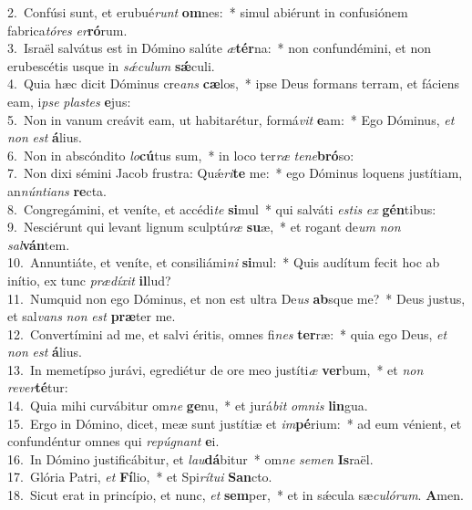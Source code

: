 {2.~}Confúsi sunt, et erubué\textit{runt} \textbf{om}nes:~* simul abiérunt in confusiónem fabrica\textit{tó}\textit{res} \textit{er}\textbf{ró}rum.\\
{3.~}Israël salvátus est in Dómino salúte \textit{æ}\textbf{tér}na:~* non confundémini, et non erubescétis usque in \textit{sǽ}\textit{cu}\textit{lum} \textbf{sǽ}culi.\\
{4.~}Quia hæc dicit Dóminus cre\textit{ans} \textbf{cæ}los,~* ipse Deus formans terram, et fáciens eam, i\textit{pse} \textit{pla}\textit{stes} \textbf{e}jus:\\
{5.~}Non in vanum creávit eam, ut habitarétur, formá\textit{vit} \textbf{e}am:~* Ego Dóminus, \textit{et} \textit{non} \textit{est} \textbf{á}lius.\\
{6.~}Non in abscóndito \textit{lo}\textbf{cú}tus sum,~* in loco ter\textit{ræ} \textit{te}\textit{ne}\textbf{bró}so:\\
{7.~}Non dixi sémini Jacob frustra: Quǽ\textit{ri}\textbf{te} me:~* ego Dóminus loquens justítiam, an\textit{nún}\textit{ti}\textit{ans} \textbf{re}cta.\\
{8.~}Congregámini, et veníte, et accédi\textit{te} \textbf{si}mul~* qui salváti \textit{e}\textit{stis} \textit{ex} \textbf{gén}tibus:\\
{9.~}Nesciérunt qui levant lignum sculptú\textit{ræ} \textbf{su}æ,~* et rogant de\textit{um} \textit{non} \textit{sal}\textbf{ván}tem.\\
{10.~}Annuntiáte, et veníte, et consiliámi\textit{ni} \textbf{si}mul:~* Quis audítum fecit hoc ab inítio, ex tunc \textit{præ}\textit{dí}\textit{xit} \textbf{il}lud?\\
{11.~}Numquid non ego Dóminus, et non est ultra De\textit{us} \textbf{ab}sque me?~* Deus justus, et sal\textit{vans} \textit{non} \textit{est} \textbf{præ}ter me.\\
{12.~}Convertímini ad me, et salvi éritis, omnes fi\textit{nes} \textbf{ter}ræ:~* quia ego Deus, \textit{et} \textit{non} \textit{est} \textbf{á}lius.\\
{13.~}In memetípso jurávi, egrediétur de ore meo justíti\textit{æ} \textbf{ver}bum,~* et \textit{non} \textit{re}\textit{ver}\textbf{té}tur:\\
{14.~}Quia mihi curvábitur om\textit{ne} \textbf{ge}nu,~* et jurá\textit{bit} \textit{om}\textit{nis} \textbf{lin}gua.\\
{15.~}Ergo in Dómino, dicet, meæ sunt justítiæ et \textit{im}\textbf{pé}rium:~* ad eum vénient, et confundéntur omnes qui \textit{re}\textit{pú}\textit{gnant} \textbf{e}i.\\
{16.~}In Dómino justificábitur, et \textit{lau}\textbf{dá}bitur~* om\textit{ne} \textit{se}\textit{men} \textbf{Is}raël.\\
{17.~}Glória Patri, \textit{et} \textbf{Fí}lio,~* et Spi\textit{rí}\textit{tu}\textit{i} \textbf{San}cto.\\
{18.~}Sicut erat in princípio, et nunc, \textit{et} \textbf{sem}per,~* et in sǽcula sæ\textit{cu}\textit{ló}\textit{rum}. \textbf{A}men.\\
